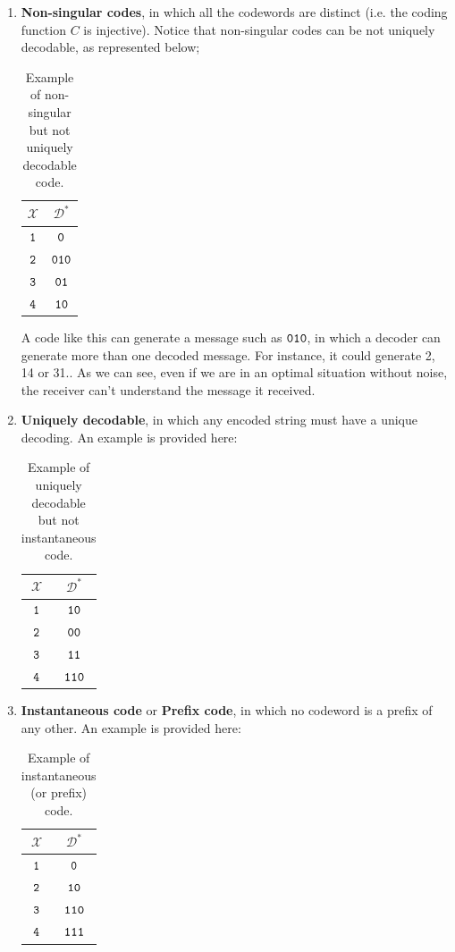 \begin{enumerate}
    \item \textbf{Non-singular codes}, in which all the codewords are distinct (i.e. the coding function $C$ is injective). Notice that non-singular codes can be not uniquely decodable, as represented below;

    \begin{table}[H]
	\centering
	\begin{tabular}{| c | c |}
		\hline
		$\mathcal{X}$ & $\mathcal{D}^*$\\\hline
		$\verb|1|$ & $\verb|0|$ \\
		$\verb|2|$ & $\verb|010|$ \\
		$\verb|3|$ & $\verb|01|$ \\
		$\verb|4|$ & $\verb|10|$ \\
		\hline
	\end{tabular}
	\caption{Example of non-singular but not uniquely decodable code.}
    \end{table}

    A code like this can generate a message such as $\verb|010|$, in which a decoder can generate more than one decoded message. For instance, it could generate 2, 14 or 31.. As we can see, even if we are in an optimal situation without noise, the receiver can't understand the message it received.

    \item \textbf{Uniquely decodable}, in which any encoded string must have a unique decoding. An example is provided here:

    \begin{table}[H]
	\centering
	\begin{tabular}{| c | c |}
		\hline
		$\mathcal{X}$ & $\mathcal{D}^*$\\\hline
		$\verb|1|$ & $\verb|10|$ \\
		$\verb|2|$ & $\verb|00|$ \\
		$\verb|3|$ & $\verb|11|$ \\
		$\verb|4|$ & $\verb|110|$ \\
		\hline
	\end{tabular}
	\caption{Example of uniquely decodable but not instantaneous code.}
    \end{table}

    \item \textbf{Instantaneous code} or \textbf{Prefix code}, in which no codeword is a prefix of any other. An example is provided here:

    \begin{table}[H]
	\centering
	\begin{tabular}{| c | c |}
		\hline
		$\mathcal{X}$ & $\mathcal{D}^*$\\\hline
		$\verb|1|$ & $\verb|0|$ \\
		$\verb|2|$ & $\verb|10|$ \\
		$\verb|3|$ & $\verb|110|$ \\
		$\verb|4|$ & $\verb|111|$ \\
		\hline
	\end{tabular}
	\caption{Example of instantaneous (or prefix) code.}
    \end{table}
    

\end{enumerate}

